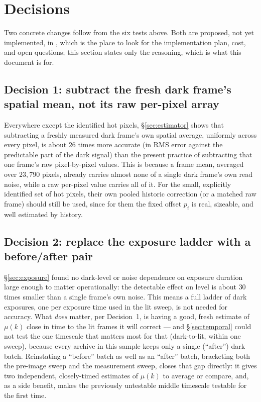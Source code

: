 \documentclass[11pt,a4paper]{article}
\newcommand{\file}[1]{\texttt{\seqsplit{#1}}}
\begin{document}
\section{Decisions}
\label{sec:decisions}

Two concrete changes follow from the six tests above. Both are proposed,
not yet implemented, in \file{docs/design-updates-prompt-1.md}, which is
the place to look for the implementation plan, cost, and open questions;
this section states only the reasoning, which is what this document is
for.

\subsection*{Decision 1: subtract the fresh dark frame's spatial mean, not
its raw per-pixel array}

Everywhere except the identified hot pixels, \S\ref{sec:estimator} shows
that subtracting a freshly measured dark frame's own spatial average,
uniformly across every pixel, is about $26$ times more accurate (in RMS
error against the predictable part of the dark signal) than the present
practice of subtracting that one frame's raw pixel-by-pixel values. This
is because a frame mean, averaged over $23{,}790$ pixels, already carries
almost none of a single dark frame's own read noise, while a raw per-pixel
value carries all of it. For the small, explicitly identified set of hot
pixels, their own pooled historic correction (or a matched raw frame) should
still be used, since for them the fixed offset $p_i$ is real, sizeable, and
well estimated by history.

\subsection*{Decision 2: replace the exposure ladder with a before/after
pair}

\S\ref{sec:exposure} found no dark-level or noise dependence on exposure
duration large enough to matter operationally: the detectable effect on
level is about $30$ times smaller than a single frame's own noise. This
means a full ladder of dark exposures, one per exposure time used in the
lit sweep, is not needed for accuracy. What \emph{does} matter, per
Decision~1, is having a good, fresh estimate of $\mu(k)$ close in time to
the lit frames it will correct --- and \S\ref{sec:temporal} could not test
the one timescale that matters most for that (dark-to-lit, within one
sweep), because every archive in this sample keeps only a single
(``after'') dark batch. Reinstating a ``before'' batch as well as an
``after'' batch, bracketing both the pre-image sweep and the measurement
sweep, closes that gap directly: it gives two independent, closely-timed
estimates of $\mu(k)$ to average or compare, and, as a side benefit, makes
the previously untestable middle timescale testable for the first time.
\end{document}
